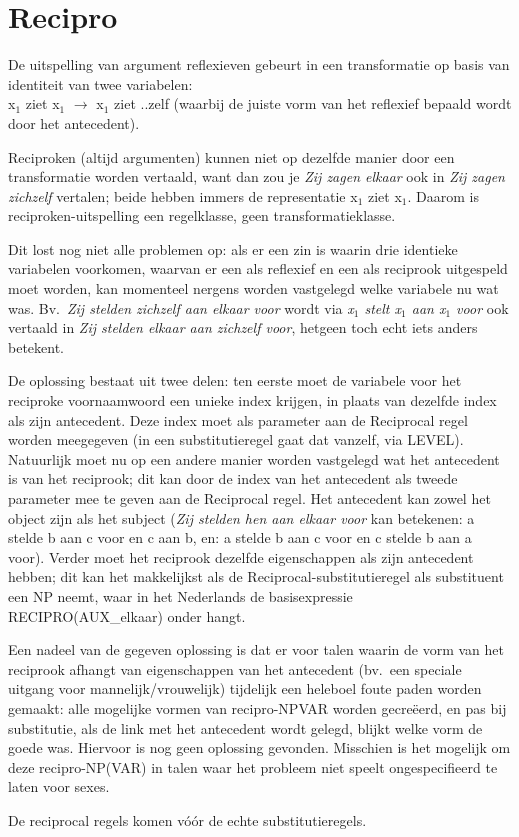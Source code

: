 \section{Recipro}
De uitspelling van argument reflexieven gebeurt in een transformatie op basis 
van identiteit van twee variabelen:\\
 x$_{1}$ ziet x$_{1}$ $\rightarrow$ x$_{1}$ ziet ..zelf (waarbij de juiste vorm 
van het reflexief bepaald wordt door het antecedent).

Reciproken (altijd argumenten) kunnen niet op dezelfde manier door een 
transformatie worden vertaald, want dan zou je {\em Zij zagen elkaar\/} ook in 
{\em Zij zagen zichzelf\/} vertalen; beide hebben immers de representatie 
x$_{1}$ ziet x$_{1}$. Daarom is reciproken-uitspelling een regelklasse, geen
transformatieklasse.

Dit lost nog niet alle problemen op: als er een zin is waarin drie identieke 
variabelen voorkomen, waarvan er een als reflexief en een als reciprook 
uitgespeld moet worden, kan momenteel nergens worden vastgelegd welke variabele
nu wat was. Bv.\ {\em Zij stelden zichzelf aan elkaar voor\/} wordt via 
{\em x$_{1}$ stelt x$_{1}$ aan x$_{1}$ voor\/}
ook vertaald in {\em Zij stelden elkaar aan zichzelf voor\/}, hetgeen toch echt
iets anders betekent. 

De oplossing bestaat uit twee delen: ten eerste moet de variabele voor het 
reciproke voornaamwoord een unieke index krijgen, in plaats van dezelfde index
als zijn antecedent. Deze index moet als parameter aan de Reciprocal regel
worden meegegeven (in een substitutieregel gaat dat vanzelf, via LEVEL). 
Natuurlijk moet nu op een andere manier worden vastgelegd 
wat het antecedent is van het reciprook; dit kan door de index van het 
antecedent als tweede parameter mee te geven aan de Reciprocal regel. Het 
antecedent kan zowel het object zijn als het subject ({\em Zij stelden hen aan 
elkaar voor\/} kan betekenen: a stelde b aan c voor en c aan b, en: a stelde b 
aan c voor en c stelde b aan a voor).
Verder moet het reciprook dezelfde eigenschappen als zijn antecedent hebben; 
dit kan het makkelijkst als de Reciprocal-substitutieregel als substituent een 
NP neemt, waar in het Nederlands de 
basisexpressie RECIPRO(AUX\_elkaar) onder hangt. 

Een nadeel van de gegeven oplossing is dat er voor talen waarin de vorm van het 
reciprook afhangt van eigenschappen van het antecedent (bv.\ een speciale 
uitgang voor mannelijk/vrouwelijk) tijdelijk een heleboel 
foute paden worden gemaakt: alle mogelijke vormen van recipro-NPVAR worden 
gecre\"{e}erd, en pas
bij substitutie, als de link met het antecedent wordt gelegd, blijkt welke vorm 
de goede was. Hiervoor is nog geen oplossing gevonden. Misschien is het 
mogelijk om deze recipro-NP(VAR) in talen waar het probleem niet speelt 
ongespecifieerd te laten voor sexes.

De reciprocal regels komen v\'{o}\'{o}r de echte substitutieregels.



